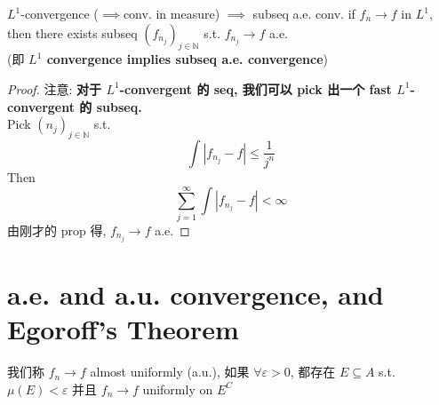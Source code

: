 \documentclass[lang=cn,11pt]{elegantbook}
\begin{document}
\begin{corollary}{$L^1$-convergence ($\implies$conv. in measure) $\implies$ subseq a.e. conv. }
    if $f_n \rightarrow f$ in $L^1$, then there exists subseq $(f_{n_j})_{j\in \mathbb{N}}$ s.t. $f_{n_j} \rightarrow f$ a.e. \\
    (即 \textbf{$L^1$ convergence implies subseq a.e. convergence})
\end{corollary}
\begin{proof}
    注意: \textbf{对于 $L^1$-convergent 的 seq, 我们可以 pick 出一个 fast $L^1$-convergent 的 subseq.}\\
    Pick $(n_j)_{j\in\mathbb{N}}$ s.t. 
    \[
    \int |f_{n_j} - f| \leq \frac{1}{j^n}
    \]
    Then \[
    \sum_{j=1}^\infty \int |f_{n_j}-f| < \infty
    \]
    由刚才的 prop 得, $f_{n_j}\rightarrow f$ a.e.
\end{proof}
  \begin{comment}
\begin{remark}
这里直接证明了 $L^1$-convergence $\implies$ subseq a.e. conv, 而我们也可以\textbf{在中间加上 conv. in measure }这一过渡.\\
我们可以通过\[ \mu(B_{n,k}^c)  \leq k \int |f_n-f|\] 的关系, 加上 $L^1$-convergence 对这个积分的控制, 简单得到 \textbf{$L^1$ convergent implies convergent in measure}.\\
至于 convergent in measure 证明 subseq a.e. conv, 这一部分在 Folland 2.30. \textbf{Convergent in measure implies Cauchy in measure, and Cauchy in measure implies subseq a.e. conv.} (这个证明看起来还挺麻烦的.)
  
    我们取一个 subseq $(g_j) := (f_{n_j})$, 其满足 \[
    \mu( E_j := \{x: |g_j(x)- g_{j+1} (x) | \geq \frac{1}{2^j}\}) \leq \frac{1}{2^j} 
    \]

\end{remark}
\end{comment}




\section{a.e. and a.u. convergence, and Egoroff's Theorem}
\begin{definition}
    我们称 $f_n\rightarrow f$ almost uniformly (a.u.), 如果 $\forall \varepsilon > 0$, 都存在 $E \subseteq A$ s.t. $\mu(E) < \varepsilon$ 并且 $f_n \rightarrow f$ uniformly on $E^C$
\end{definition}
\end{document}

